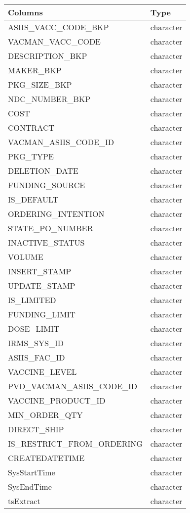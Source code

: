 \documentclass[
  letterpaper,
  DIV=11,
  numbers=noendperiod]{scrreprt}
\begin{document}
\begin{longtable}{ll}
\toprule
Columns & Type \\ 
\midrule
ASIIS\_VACC\_CODE\_BKP & character \\ 
VACMAN\_VACC\_CODE & character \\ 
DESCRIPTION\_BKP & character \\ 
MAKER\_BKP & character \\ 
PKG\_SIZE\_BKP & character \\ 
NDC\_NUMBER\_BKP & character \\ 
COST & character \\ 
CONTRACT & character \\ 
VACMAN\_ASIIS\_CODE\_ID & character \\ 
PKG\_TYPE & character \\ 
DELETION\_DATE & character \\ 
FUNDING\_SOURCE & character \\ 
IS\_DEFAULT & character \\ 
ORDERING\_INTENTION & character \\ 
STATE\_PO\_NUMBER & character \\ 
INACTIVE\_STATUS & character \\ 
VOLUME & character \\ 
INSERT\_STAMP & character \\ 
UPDATE\_STAMP & character \\ 
IS\_LIMITED & character \\ 
FUNDING\_LIMIT & character \\ 
DOSE\_LIMIT & character \\ 
IRMS\_SYS\_ID & character \\ 
ASIIS\_FAC\_ID & character \\ 
VACCINE\_LEVEL & character \\ 
PVD\_VACMAN\_ASIIS\_CODE\_ID & character \\ 
VACCINE\_PRODUCT\_ID & character \\ 
MIN\_ORDER\_QTY & character \\ 
DIRECT\_SHIP & character \\ 
IS\_RESTRICT\_FROM\_ORDERING & character \\ 
CREATEDATETIME & character \\ 
SysStartTime & character \\ 
SysEndTime & character \\ 
tsExtract & character \\ 
\bottomrule
\end{longtable}
\end{document}
